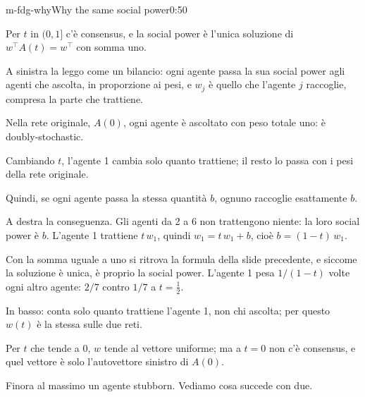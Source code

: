 \begin{slide}{m-fdg-why}{Why the same social power}{0:50}
  \begin{discorso}
    \item Per $t$ in $(0,1]$ c'è consensus, e la social power è l'unica soluzione di $w^\top A(t)=w^\top$ con somma uno.
    \item A sinistra la leggo come un bilancio: ogni agente passa la sua social power agli agenti che ascolta, in proporzione ai pesi, e $w_j$ è quello che l'agente $j$ raccoglie, compresa la parte che trattiene.
    \item Nella rete originale, $A(0)$, ogni agente è ascoltato con peso totale uno: è doubly-stochastic.
    \item Cambiando $t$, l'agente 1 cambia solo quanto trattiene; il resto lo passa con i pesi della rete originale.
    \item Quindi, se ogni agente passa la stessa quantità $b$, ognuno raccoglie esattamente $b$.
    \item A destra la conseguenza. Gli agenti da 2 a 6 non trattengono niente: la loro social power è $b$. L'agente 1 trattiene $t\,w_1$, quindi $w_1=t\,w_1+b$, cioè $b=(1-t)\,w_1$.
    \item Con la somma uguale a uno si ritrova la formula della slide precedente, e siccome la soluzione è unica, è proprio la social power. L'agente 1 pesa $1/(1-t)$ volte ogni altro agente: $2/7$ contro $1/7$ a $t=\tfrac12$.
    \item In basso: conta solo quanto trattiene l'agente 1, non chi ascolta; per questo $w(t)$ è la stessa sulle due reti.
    \item Per $t$ che tende a 0, $w$ tende al vettore uniforme; ma a $t=0$ non c'è consensus, e quel vettore è solo l'autovettore sinistro di $A(0)$.
    \item Finora al massimo un agente stubborn. Vediamo cosa succede con due.
  \end{discorso}
\end{slide}

